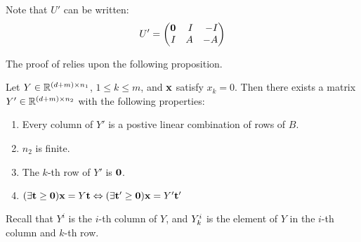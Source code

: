 Note that $U'$ can be written:
\begin{equation}\label{eq:Ulift} 
  U' = \begin{pmatrix*}[r] \0 & I & -I \\ I & A & -A \end{pmatrix*}
\end{equation}

The proof of {\Hint} relies upon the following proposition.
\begin{Prop}{\label{prop:Hintset}
Let $Y \in \mathbb{R}^{(d+m)\times n_1}$, $1 \leq k \leq m$, and $\mathbf{x}$ satisfy $x_k = 0$.  Then there exists a matrix $Y' \in \mathbb{R}^{(d+m)\times n_2}$ with the following properties:
  \begin{enumerate}
    \item Every column of $Y'$ is a postive linear combination of rows of $B$.
    \item $n_2$ is finite.
    \item The $k$-th row of $Y'$ is $\mathbf{0}$.
    \item \((\exists \mathbf{t}\geq\mathbf{0})\mathbf{x} = Y\mathbf{t} \Leftrightarrow (\exists \mathbf{t}' \geq \mathbf{0})\mathbf{x} = Y'\mathbf{t}'\)
  \end{enumerate}
}\end{Prop}
Recall that $ Y^i$ is the $i$-th column of $ Y$, and $Y^i_{k}$ is the element of $ Y$ in the $i$-th column and $k$-th row.  
